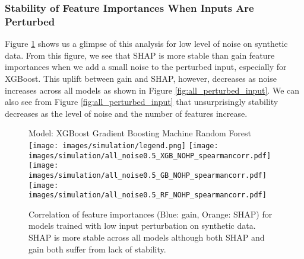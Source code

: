 \vspace{-.3cm}
\subsubsection{Stability of Feature Importances When Inputs Are Perturbed}
Figure \ref{fig:low_perturbed_input} shows us a glimpse of this analysis for low level of noise on synthetic data. From this figure, we see that SHAP is more stable than gain feature importances when we add a small noise to the perturbed input, especially for XGBoost. This uplift between gain and SHAP, however, decreases as noise increases across all models as shown in Figure \ref{fig:all_perturbed_input}. We can also see from Figure \ref{fig:all_perturbed_input} that unsurprisingly stability decreases as the level of noise and the number of features increase. 



 \begin{figure}[h]
  \centering
  \scriptsize
 Model: \hspace{1cm} XGBoost \hspace{1.5cm} Gradient Boosting Machine \hspace{0.7cm} Random Forest \\
 \texttt{[image: images/simulation/legend.png]}
  \texttt{[image: images/simulation/all\_noise0.5\_XGB\_NOHP\_spearmancorr.pdf]}
  \texttt{[image: images/simulation/all\_noise0.5\_GB\_NOHP\_spearmancorr.pdf]}
  \texttt{[image: images/simulation/all\_noise0.5\_RF\_NOHP\_spearmancorr.pdf]}
  
   \caption{Correlation of feature importances (Blue: gain, Orange: SHAP) for models trained with low input perturbation on synthetic data. SHAP is more stable across all models although both SHAP and gain both suffer from lack of stability.}
  \label{fig:low_perturbed_input}
\end{figure}

